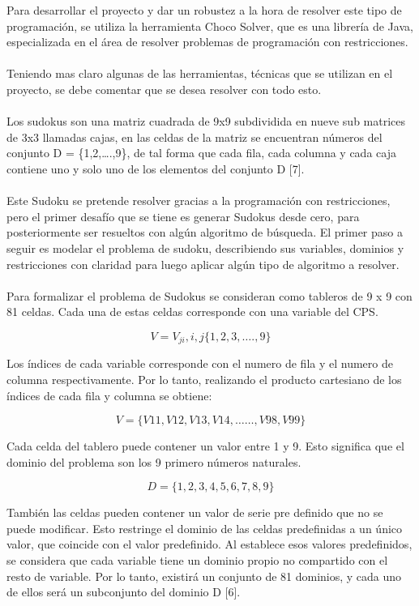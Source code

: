 \documentclass[14pt]{article}
\begin{document}
Para desarrollar el proyecto y dar un robustez a la hora de resolver este tipo de programación, se utiliza la herramienta Choco Solver, que es una librería de Java, especializada en el área de resolver problemas de programación con restricciones. 
		\\~\\
Teniendo mas claro algunas de las herramientas, técnicas que se utilizan en el proyecto, se  debe comentar que se desea resolver con todo esto.
		\\~\\
Los sudokus son una matriz cuadrada de 9x9 subdividida en nueve sub matrices de 3x3 llamadas cajas, en las celdas de la matriz se encuentran números del conjunto  D = \{1,2,….,9\}, de tal forma que cada fila, cada columna y cada caja contiene uno y solo uno de los elementos del conjunto D [7].
		\\~\\
Este Sudoku se pretende resolver gracias a la programación con restricciones, pero el primer desafío que se tiene es  generar Sudokus desde cero, para posteriormente ser resueltos con algún algoritmo de búsqueda. El primer paso a seguir es modelar el problema de sudoku, describiendo sus variables, dominios y restricciones con claridad para luego aplicar algún tipo de algoritmo a resolver.
		\\~\\
Para formalizar el problema de Sudokus se consideran como tableros de 9 x 9 con 81 celdas. Cada una de estas celdas corresponde con una variable del CPS.
	
\[V = V_{ji} ,  i , j  \{1,2,3,….,9\}\]

Los índices de cada variable corresponde con el numero de fila y el numero de columna respectivamente. Por lo tanto, realizando el producto cartesiano de los índices de cada fila y columna se obtiene:

\[V = \{V11,V12,V13,V14,……,V98,V99\}\]

Cada celda del tablero puede contener un valor entre 1 y 9. Esto significa que el dominio del problema son los 9 primero números naturales.

\[D = \{1,2,3,4,5,6,7,8,9\}\]

También las celdas pueden contener un valor de serie pre definido que no se puede modificar. Esto restringe el dominio de las celdas predefinidas a un único valor, que coincide con el valor predefinido. Al establece esos valores predefinidos, se considera que cada variable tiene un dominio propio no compartido con el resto de variable. Por lo tanto, existirá un conjunto de 81 dominios, y cada uno de ellos será un subconjunto del dominio D [6].
\end{document}
